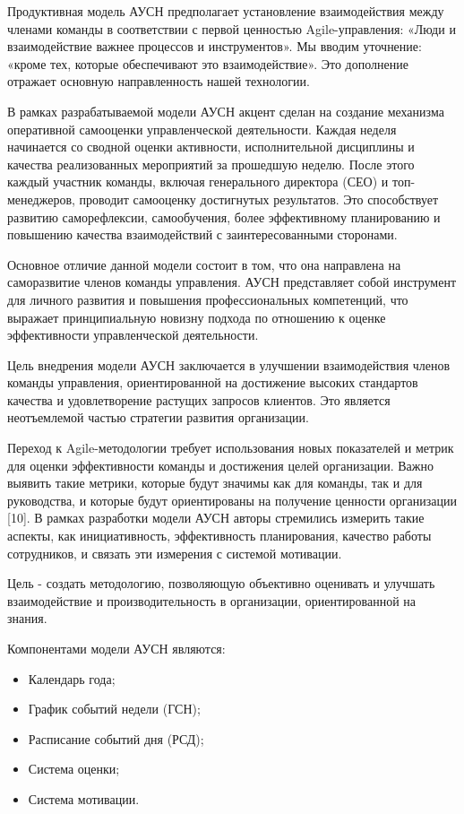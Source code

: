 \begin{multicols}{2}

Продуктивная модель АУСН предполагает установление взаимодействия между
членами команды в соответствии с первой ценностью Agile-управления:
«Люди и взаимодействие важнее процессов и инструментов». Мы вводим
уточнение: «кроме тех, которые обеспечивают это взаимодействие». Это
дополнение отражает основную направленность нашей технологии.

В рамках разрабатываемой модели АУСН акцент сделан на создание механизма
оперативной самооценки управленческой деятельности. Каждая неделя
начинается со сводной оценки активности, исполнительной дисциплины и
качества реализованных мероприятий за прошедшую неделю. После этого
каждый участник команды, включая генерального директора (СЕО) и
топ-менеджеров, проводит самооценку достигнутых результатов. Это
способствует развитию саморефлексии, самообучения, более эффективному
планированию и повышению качества взаимодействий с заинтересованными
сторонами.

Основное отличие данной модели состоит в том, что она направлена на
саморазвитие членов команды управления. АУСН представляет собой
инструмент для личного развития и повышения профессиональных
компетенций, что выражает принципиальную новизну подхода по отношению к
оценке эффективности управленческой деятельности.

Цель внедрения модели АУСН заключается в улучшении взаимодействия членов
команды управления, ориентированной на достижение высоких стандартов
качества и удовлетворение растущих запросов клиентов. Это является
неотъемлемой частью стратегии развития организации.

Переход к Agile-методологии требует использования новых показателей и
метрик для оценки эффективности команды и достижения целей организации.
Важно выявить такие метрики, которые будут значимы как для команды, так
и для руководства, и которые будут ориентированы на получение ценности
организации {[}10{]}. В рамках разработки модели АУСН авторы стремились
измерить такие аспекты, как инициативность, эффективность планирования,
качество работы сотрудников, и связать эти измерения с системой
мотивации.

Цель - создать методологию, позволяющую объективно оценивать и улучшать
взаимодействие и производительность в организации, ориентированной на
знания.

Компонентами модели АУСН являются:

\begin{itemize}
\item
  Календарь года;
\item
  График событий недели (ГСН);
\item
  Расписание событий дня (РСД);
\item
  Система оценки;
\item
  Система мотивации.
\end{itemize}


\end{multicols}
